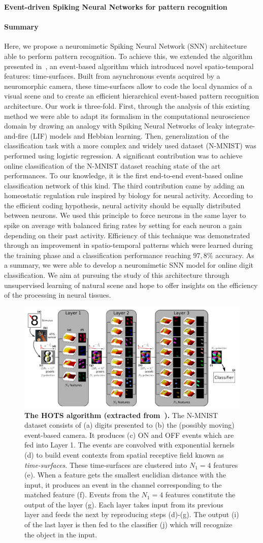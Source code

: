 \documentclass[12pt]{article}
\newcommand{\citep}[1]{\parencite{#1}}
\newcommand{\citet}[1]{\textcite{#1}}
\newcommand{\AuthorAG}{Antoine Grimaldi}
\newcommand{\AuthorLP}{Laurent Perrinet}
\newcommand{\AuthorVB}{Victor Boutin}
\newcommand{\AddressLP}{Institut de Neurosciences de la Timone (UMR 7289); Aix Marseille Univ, CNRS; Marseille, France}%
\newcommand{\AuthorSI}{Sio-Hoi Ieng}
\newcommand{\AuthorRB}{Ryad Benosman}%
\newcommand{\AddressRB}{Sorbonne Université, INSERM, CNRS, Institut de la Vision, France;}%
\newcommand{\Summary}{ %
Here, we propose a neuromimetic Spiking Neural Network (SNN) architecture able to perform pattern recognition. %
To achieve this, we extended the algorithm presented in~\citet{Lagorce17}, an event-based algorithm which introduced novel spatio-temporal features: time-surfaces. Built from asynchronous events acquired by a neuromorphic camera, these time-surfaces allow to code the local dynamics of a visual scene and to create an efficient hierarchical event-based pattern recognition architecture. 
Our work is three-fold. First, through the analysis of this existing method we were able to adapt its formalism in the computational neuroscience domain by drawing an analogy with Spiking Neural Networks of leaky integrate-and-fire (LIF) models and Hebbian learning. 
Then, %
generalization of the classification task with a more complex and widely used dataset (N-MNIST) was performed using logistic regression. A significant contribution was to achieve online classification of the N-MNIST dataset reaching state of the art performances. To our knowledge, it is the first end-to-end event-based online classification network of this kind. The third contribution came by adding an homeostatic regulation rule inspired by biology for neural activity. According to the efficient coding hypothesis, neural activity should be equally distributed between neurons. We used this principle to force neurons in the same layer to spike on average with balanced firing rates by setting for each neuron a gain depending on their past activity. Efficiency of this technique was demonstrated through an improvement in spatio-temporal patterns which were learned during the training phase and a classification performance reaching $97,8\%$ accuracy. As a summary, %
we were able to develop a neuromimetic SNN model for online digit classification. We aim at pursuing the study of this architecture through unsupervised learning of natural scene and hope to offer insights on the efficiency of the processing in neural tissues.
}
\begin{document}
{\Large\bf
Event-driven Spiking Neural Networks %
for
pattern recognition
}

%


\parindent 12pt

\paragraph*{Summary}
\Summary
%
\begin{figure}
\includegraphics[width=.99\linewidth]{../notebooks/fig/hots.png}
\caption
{
\textbf{The HOTS algorithm (extracted from~\citep{Lagorce17}).} The N-MNIST dataset consists of (a) digits presented to (b) the (possibly moving) event-based camera. It produces (c) ON and OFF events which are fed into Layer 1. The events are convolved with exponential kernels (d) to build event contexts from spatial receptive field %
known as \emph{time-surfaces}. These time-surfaces are clustered into $N_1=4$ features (e). When a feature gets the smallest euclidian distance with the input, it produces an event in the channel corresponding to the matched feature (f). Events from the $N_1=4$ features constitute the output of the layer (g). Each layer takes input from its previous layer and feeds the next by reproducing steps (d)-(g). The output (i) of the last layer is then fed to the classifier (j) which will recognize the object in the input.
\label{fig:fig1}
}
\end{figure}
\end{document}
